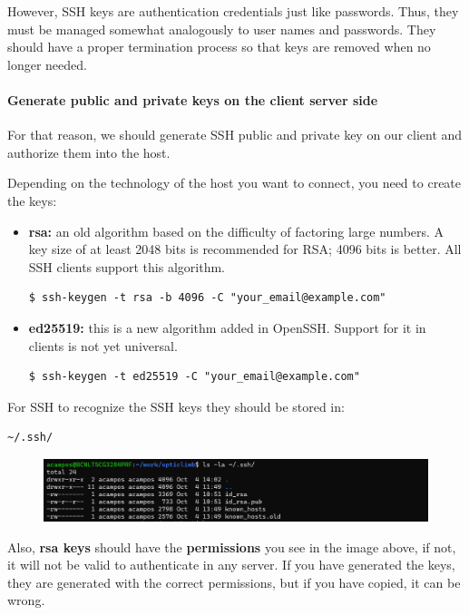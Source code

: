 \documentclass{article}
\newenvironment{blocktemplateIII}[1]{%
    \tcolorbox[beamer,%
    noparskip,breakable,
    ,colframe=Red,%
    colbacklower=LimeGreen!75!LightGreen,%
    title=#1]}%
    {\endtcolorbox}
\newenvironment{codetemplate}[1][]{%
  \mybasecolorbox[#1]
  \itshape
}{%
  \endmybasecolorbox
}
\begin{document}
However, SSH keys are authentication credentials just like passwords. Thus, they must be managed somewhat analogously to user names and passwords. They should have a proper termination process so that keys are removed when no longer needed.

\paragraph{Generate public and private keys on the client server side}

For that reason, we should generate SSH public and private key on our client and authorize them into the host.

Depending on the technology of the host you want to connect, you need to create the keys:

\begin{itemize}
    \item \textbf{rsa:} an old algorithm based on the difficulty of factoring large numbers. A key size of at least 2048 bits is recommended for RSA; 4096 bits is better. All SSH clients support this algorithm.
\begin{codetemplate}{}
\begin{verbatim}
$ ssh-keygen -t rsa -b 4096 -C "your_email@example.com" 
\end{verbatim}
\end{codetemplate}
    \item \textbf{ed25519:} this is a new algorithm added in OpenSSH. Support for it in clients is not yet universal.
\begin{codetemplate}{}
\begin{verbatim}
$ ssh-keygen -t ed25519 -C "your_email@example.com"
\end{verbatim}
\end{codetemplate}
\end{itemize}

\begin{blocktemplateIII}{WARNING}
For SSH to recognize the SSH keys they should be stored in:
\begin{codetemplate}{}
\begin{verbatim}
~/.ssh/
\end{verbatim}
\end{codetemplate}
\begin{figure}[H]
    \includegraphics[width=\textwidth]{pictures/ssh2.png}
    \centering
\end{figure}
Also, \textbf{rsa keys} should have the \textbf{permissions} you see in the image above, if not, it will not be valid to authenticate in any server. If you have generated the keys, they are generated with the correct permissions, but if you have copied, it can be wrong.
\end{blocktemplateIII}
\end{document}
